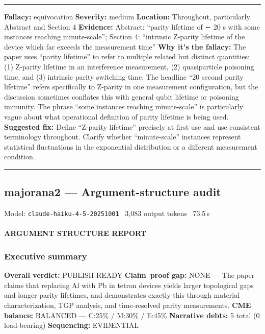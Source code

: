 \documentclass[10pt,letterpaper]{article}
\begin{document}
\begin{center}\rule{0.5\linewidth}{0.5pt}\end{center}

\textbf{Fallacy:} equivocation
\textbf{Severity:} medium
\textbf{Location:} Throughout, particularly Abstract and Section 4
\textbf{Evidence:} Abstract: ``parity lifetime of ∼ 20 s with some instances reaching minute-scale''; Section 4: ``intrinsic Z-parity lifetime of the device which far exceeds the measurement time''
\textbf{Why it's the fallacy:} The paper uses ``parity lifetime'' to refer to multiple related but distinct quantities: (1) Z-parity lifetime in an interference measurement, (2) quasiparticle poisoning time, and (3) intrinsic parity switching time. The headline ``20 second parity lifetime'' refers specifically to Z-parity in one measurement configuration, but the discussion sometimes conflates this with general qubit lifetime or poisoning immunity. The phrase ``some instances reaching minute-scale'' is particularly vague about what operational definition of parity lifetime is being used.
\textbf{Suggested fix:} Define ``Z-parity lifetime'' precisely at first use and use consistent terminology throughout. Clarify whether ``minute-scale'' instances represent statistical fluctuations in the exponential distribution or a different measurement condition.

\begin{center}\rule{0.5\linewidth}{0.5pt}\end{center}


\subsection{majorana2 --- Argument-structure audit}
\noindent\textcolor{muted}{\small Model: \texttt{claude-haiku-4-5-20251001} \textperiodcentered\ 3,083 output tokens \textperiodcentered\ 73.5\,s}

\hypertarget{argument-structure-report}{%
\paragraph{ARGUMENT STRUCTURE REPORT}\label{argument-structure-report}}

\hypertarget{executive-summary}{%
\subsubsection{Executive summary}\label{executive-summary}}

\textbf{Overall verdict:} PUBLISH-READY
\textbf{Claim--proof gap:} NONE --- The paper claims that replacing Al with Pb in tetron devices yields larger topological gaps and longer parity lifetimes, and demonstrates exactly this through material characterization, TGP analysis, and time-resolved parity measurements.
\textbf{CME balance:} BALANCED --- C:25\% / M:30\% / E:45\%
\textbf{Narrative debts:} 5 total (0 load-bearing)
\textbf{Sequencing:} EVIDENTIAL
\end{document}
